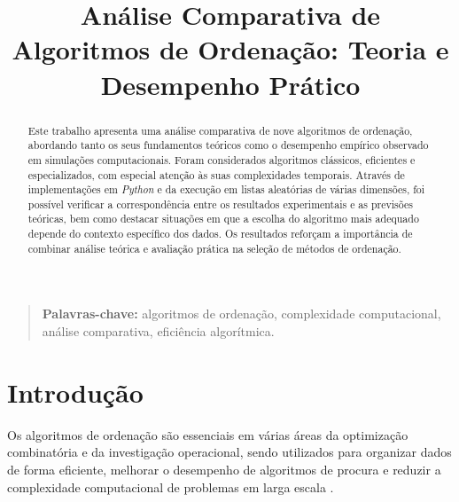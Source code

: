 \documentclass[conference]{IEEEtran}
\begin{document}
\title{Análise Comparativa de Algoritmos de Ordenação: Teoria e Desempenho Prático}

\author{
\and
{}
}

\maketitle
\thispagestyle{plain}

\begin{abstract}
Este trabalho apresenta uma análise comparativa de nove algoritmos de ordenação, abordando tanto os seus fundamentos teóricos como o desempenho empírico observado em simulações computacionais. Foram considerados algoritmos clássicos, eficientes e especializados, com especial atenção às suas complexidades temporais. Através de implementações em \textit{Python} e da execução em listas aleatórias de várias dimensões, foi possível verificar a correspondência entre os resultados experimentais e as previsões teóricas, bem como destacar situações em que a escolha do algoritmo mais adequado depende do contexto específico dos dados. Os resultados reforçam a importância de combinar análise teórica e avaliação prática na seleção de métodos de ordenação.
\end{abstract}

\begin{quote}
\small
\noindent
\textbf{Palavras-chave:} algoritmos de ordenação, complexidade computacional, análise comparativa, eficiência algorítmica.
\end{quote}

\IEEEpeerreviewmaketitle

\section{Introdução}

Os algoritmos de ordenação são essenciais em várias áreas da optimização combinatória e da investigação operacional, sendo utilizados para organizar dados de forma eficiente, melhorar o desempenho de algoritmos de procura e reduzir a complexidade computacional de problemas em larga escala \cite{intro1}.
\end{document}
